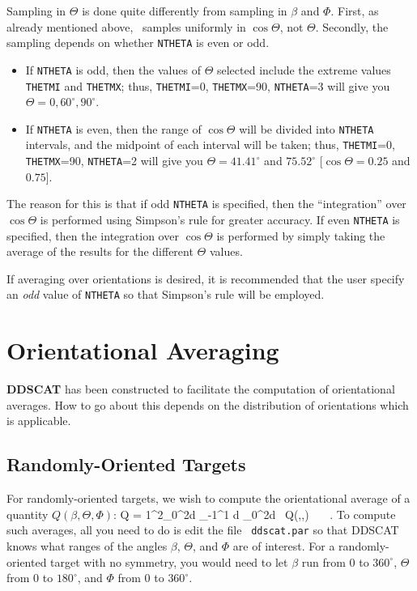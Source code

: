 Sampling in $\Theta$ is done quite differently from sampling in
$\beta$ and $\Phi$.  First, as already mentioned above, \ddscatv\ 
samples uniformly in $\cos\Theta$, not $\Theta$.
Secondly, the sampling depends on whether {\tt NTHETA} is even or odd.
\begin{itemize}
\item If {\tt NTHETA} is odd, then the values of $\Theta$ selected
	include the extreme values {\tt THETMI} and {\tt THETMX}; thus, 
        {\tt THETMI}=0, {\tt THETMX}=90, {\tt NTHETA}=3 will give you
	$\Theta=0,60^\circ,90^\circ$.
\item If {\tt NTHETA} is even, then the range of $\cos\Theta$ will be
	divided into {\tt NTHETA} intervals, and the midpoint of each interval
	will be taken; thus, {\tt THETMI}=0, {\tt THETMX}=90, {\tt NTHETA}=2
	will give you $\Theta=41.41^\circ$ and $75.52^\circ$
	[$\cos\Theta=0.25$ and $0.75$].
\end{itemize}
The reason for this is that if odd {\tt NTHETA} is specified, then the
``integration'' over $\cos\Theta$ is performed using Simpson's rule
for greater accuracy.  If even {\tt NTHETA} is specified, then the
integration over $\cos\Theta$ is performed by simply taking the
average of the results for the different $\Theta$ values.

If averaging over orientations is desired, it is recommended that the
user specify an {\it odd} value of {\tt NTHETA} so that Simpson's rule
will be employed.

\section{Orientational Averaging\label{sec:orientational_averaging}}
\index{orientational averaging}

{{\bf DDSCAT}} has been constructed to facilitate the computation of
orientational averages.  How to go about this depends on the
distribution of orientations which is applicable.

\subsection{ Randomly-Oriented Targets}
For randomly-oriented targets, we wish to compute the orientational
average of a quantity $Q(\beta,\Theta,\Phi)$:
\beq
\langle Q \rangle = {1\pi^2}\int_0^{2\pi}d\beta
\int_{-1}^1 d\cos\Theta
\int_0^{2\pi}d\Phi ~ Q(\beta,\Theta,\Phi) ~~~.
\eeq
To compute such averages, all you need to do is edit the file {\tt
ddscat.par} so that DDSCAT knows what ranges of the angles $\beta$,
$\Theta$, and $\Phi$ are of interest.  For a randomly-oriented target
with no symmetry, you would need to let $\beta$ run from 0 to
$360^\circ$, $\Theta$ from 0 to $180^\circ$, and $\Phi$ from 0 to
$360^\circ$.

